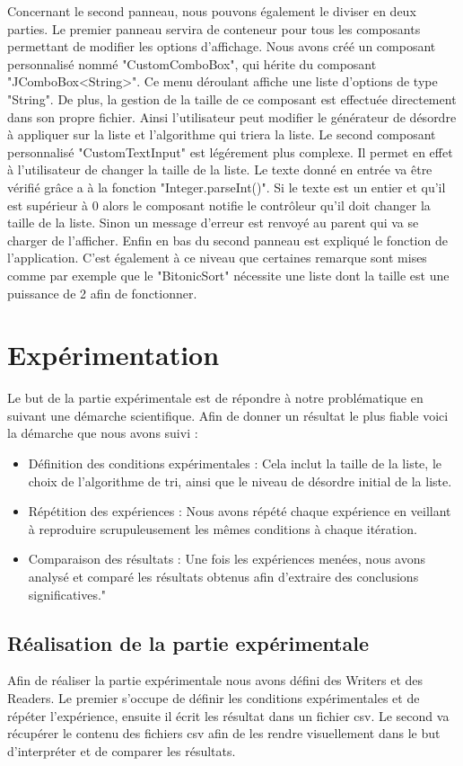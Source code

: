 \documentclass[a4paper,12pt]{article}
\begin{document}
Concernant le second panneau, nous pouvons également le diviser en deux parties. Le premier panneau servira de conteneur pour tous les composants permettant de modifier les options d'affichage. Nous avons créé un composant personnalisé nommé "CustomComboBox", qui hérite du composant "JComboBox<String>". Ce menu déroulant affiche une liste d'options de type "String". De plus, la gestion de la taille de ce composant est effectuée directement dans son propre fichier. Ainsi l'utilisateur peut modifier le générateur de désordre à appliquer sur la liste et l'algorithme qui triera la liste. Le second composant personnalisé "CustomTextInput" est légérement plus complexe. Il permet en effet à l'utilisateur de changer la taille de la liste. Le texte donné en entrée va être vérifié grâce a à la fonction "Integer.parseInt()". Si le texte est un entier et qu'il est supérieur à 0 alors le composant notifie le contrôleur qu'il doit changer la taille de la liste. Sinon un message d'erreur est renvoyé au parent qui va se charger de l'afficher. Enfin en bas du second panneau est expliqué le fonction de l'application. C'est également à ce niveau que certaines remarque sont mises comme par exemple que le "BitonicSort" nécessite une liste dont la taille est une puissance de 2 afin de fonctionner. 
\section{Expérimentation}
Le but de la partie expérimentale est de répondre à notre problématique en suivant une démarche scientifique. Afin de donner un résultat le plus fiable voici la démarche que nous avons suivi : 
    \begin{itemize}
        \item Définition des conditions expérimentales : Cela inclut la taille de la liste, le choix de l'algorithme de tri, ainsi que le niveau de désordre initial de la liste.
        \item Répétition des expériences : Nous avons répété chaque expérience en veillant à reproduire scrupuleusement les mêmes conditions à chaque itération.
        \item Comparaison des résultats : Une fois les expériences menées, nous avons analysé et comparé les résultats obtenus afin d'extraire des conclusions significatives."
    \end{itemize}
\subsection{Réalisation de la partie expérimentale}
Afin de réaliser la partie expérimentale nous avons défini des Writers et des Readers. Le premier s'occupe de définir les conditions expérimentales et de répéter l'expérience, ensuite il écrit les résultat dans un fichier csv. Le second va récupérer le contenu des fichiers csv afin de les rendre visuellement dans le but d'interpréter et de comparer les résultats.\\
\end{document}
